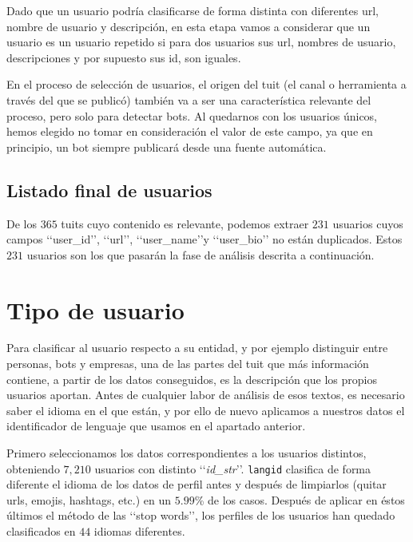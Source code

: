 Dado que un usuario podría clasificarse de forma distinta con diferentes url, nombre de usuario y 
descripción, en esta etapa vamos a considerar que un usuario es un usuario repetido si para dos 
usuarios sus url, nombres de usuario, descripciones y por supuesto sus id, son iguales.

En el proceso de selección de usuarios, el origen del tuit (el canal o herramienta a través del que 
se publicó) también va a ser una característica relevante del proceso, pero solo para detectar bots. 
Al quedarnos con los usuarios únicos, hemos elegido no tomar en consideración el valor de
este campo, ya que en principio, un bot siempre publicará desde una fuente automática.


\subsection{Listado final de usuarios}
De los $365$ tuits cuyo contenido es relevante, podemos extraer $231$ usuarios cuyos campos
\lq\lq user\_id\rq\rq, \lq\lq url\rq\rq, \lq\lq user\_name\rq\rq y \lq\lq user\_bio\rq\rq
no están duplicados. Estos $231$ usuarios son los que pasarán la fase de análisis descrita a continuación.


\section{Tipo de usuario}
\label{sect:tipo_de_usuario}

Para clasificar al usuario respecto a su entidad, y por ejemplo distinguir entre personas, bots y empresas, 
una de las partes del tuit que más información contiene, a partir de los datos conseguidos, es
la descripción que los propios usuarios aportan. Antes de cualquier labor de análisis de esos textos,
es necesario saber el idioma en el que están, y por ello de nuevo aplicamos a nuestros datos 
el identificador de lenguaje que usamos en el apartado anterior. 

Primero seleccionamos los datos correspondientes a los usuarios distintos, obteniendo
$7,210$ usuarios con distinto \lq\lq{\em id\_str}\rq\rq. {\tt langid} clasifica de 
forma diferente el idioma de los datos de perfil antes y después de 
limpiarlos (quitar urls, emojis, hashtags, etc.) en un $5.99$\%
de los casos. Después de aplicar en éstos últimos el método de las \lq\lq stop words\rq\rq, 
los perfiles de los usuarios han quedado clasificados en $44$ idiomas diferentes.


